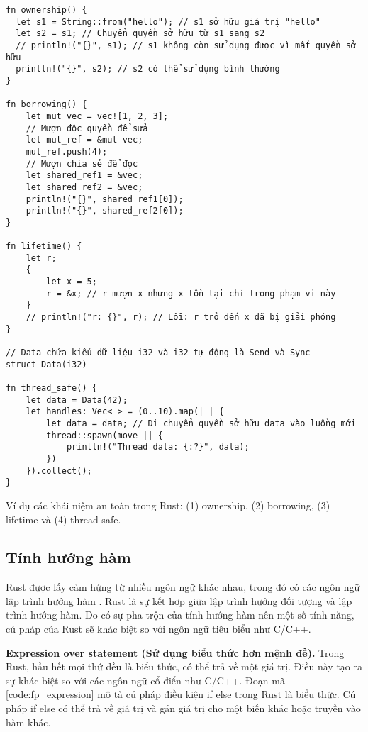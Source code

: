 \begin{listing}[H]
\begin{verbatim}
fn ownership() {
  let s1 = String::from("hello"); // s1 sở hữu giá trị "hello"
  let s2 = s1; // Chuyển quyền sở hữu từ s1 sang s2
  // println!("{}", s1); // s1 không còn sử dụng được vì mất quyền sở hữu
  println!("{}", s2); // s2 có thể sử dụng bình thường
}

fn borrowing() {
    let mut vec = vec![1, 2, 3];
    // Mượn độc quyền để sửa
    let mut_ref = &mut vec;
    mut_ref.push(4);
    // Mượn chia sẻ để đọc
    let shared_ref1 = &vec;
    let shared_ref2 = &vec;
    println!("{}", shared_ref1[0]);
    println!("{}", shared_ref2[0]);
}

fn lifetime() {
    let r;
    {
        let x = 5;
        r = &x; // r mượn x nhưng x tồn tại chỉ trong phạm vi này
    }
    // println!("r: {}", r); // Lỗi: r trỏ đến x đã bị giải phóng
}

// Data chứa kiểu dữ liệu i32 và i32 tự động là Send và Sync
struct Data(i32)

fn thread_safe() {
    let data = Data(42);
    let handles: Vec<_> = (0..10).map(|_| {
        let data = data; // Di chuyển quyền sở hữu data vào luồng mới
        thread::spawn(move || {
            println!("Thread data: {:?}", data);
        })
    }).collect();
}
\end{verbatim}
\caption{Ví dụ các khái niệm an toàn trong Rust: (1) ownership, (2) borrowing, (3) lifetime và (4) thread safe.}
\label{code:c2_safe_rust}
\end{listing}

\subsection{Tính hướng hàm}

Rust được lấy cảm hứng từ nhiều ngôn ngữ khác nhau, trong đó có các ngôn ngữ lập trình hướng hàm \cite{hughes1989functional}.
Rust là sự kết hợp giữa lập trình hướng đối tượng và lập trình hướng hàm.
Do có sự pha trộn của tính hướng hàm nên một số tính năng, cú pháp của Rust sẽ khác biệt so với ngôn ngữ tiêu biểu như C/C++.

\textbf{Expression over statement (Sử dụng biểu thức hơn mệnh đề).}
Trong Rust, hầu hết mọi thứ đều là biểu thức, có thể trả về một giá trị.
Điều này tạo ra sự khác biệt so với các ngôn ngữ cổ điển như C/C++.
Đoạn mã \ref{code:fp_expression} mô tả cú pháp điều kiện if else trong Rust là biểu thức.
Cú pháp if else có thể trả về giá trị và gán giá trị cho một biến khác hoặc truyền vào hàm khác.

